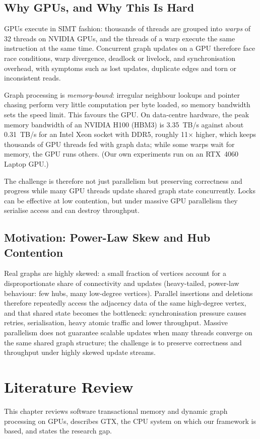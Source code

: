 \documentclass[11pt,a4paper,oneside]{report}
\begin{document}
\section{Why GPUs, and Why This Is Hard}
GPUs execute in SIMT fashion: thousands of threads are grouped into \emph{warps} of 32 threads on NVIDIA GPUs, and the
threads of a warp execute the same instruction at the same time. Concurrent graph updates on a GPU therefore face race
conditions, warp divergence, deadlock or livelock, and synchronisation overhead, with symptoms such as lost updates,
duplicate edges and torn or inconsistent reads.

Graph processing is \emph{memory-bound}: irregular neighbour lookups and pointer chasing perform very little
computation per byte loaded, so memory bandwidth sets the speed limit. This favours the GPU. On data-centre hardware,
the peak memory bandwidth of an NVIDIA H100 (HBM3) is 3.35~TB/s against about 0.31~TB/s for an Intel Xeon socket with
DDR5, roughly 11$\times$ higher, which keeps thousands of GPU threads fed with graph data; while some warps wait for
memory, the GPU runs others. (Our own experiments run on an RTX~4060 Laptop GPU.)

The challenge is therefore not just parallelism but preserving correctness and progress while many GPU threads update
shared graph state concurrently. Locks can be effective at low contention, but under massive GPU parallelism they
serialise access and can destroy throughput.

\section{Motivation: Power-Law Skew and Hub Contention}
Real graphs are highly skewed: a small fraction of vertices account for a disproportionate share of connectivity and
updates (heavy-tailed, power-law behaviour: few hubs, many low-degree vertices). Parallel insertions and deletions
therefore repeatedly access the adjacency data of the same high-degree vertex, and that shared state becomes the
bottleneck: synchronisation pressure causes retries, serialisation, heavy atomic traffic and lower throughput. Massive
parallelism does not guarantee scalable updates when many threads converge on the same shared graph structure; the
challenge is to preserve correctness and throughput under highly skewed update streams.

\chapter{Literature Review}
\label{ch:lit}
This chapter reviews software transactional memory and dynamic graph processing on GPUs, describes GTX, the CPU system
on which our framework is based, and states the research gap.
\end{document}
